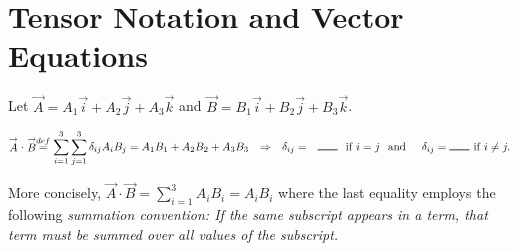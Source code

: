 
\chapter{Tensor Notation and Vector Equations} %

\label{Chapter1} %


\newcommand{\keyword}[1]{\textbf{#1}}
\newcommand{\tabhead}[1]{\textbf{#1}}
\newcommand{\code}[1]{\texttt{#1}}
\newcommand{\file}[1]{\texttt{\bfseries#1}}
\newcommand{\option}[1]{\texttt{\itshape#1}}

\vspace{.2in}

Let $\stackrel{\rightarrow}{A}=A_1\stackrel{\rightarrow}{i }+A_2\stackrel{\rightarrow}{j }+A_3\stackrel{\rightarrow}{k }$ and
$\stackrel{\rightarrow}{B}=B_1\stackrel{\rightarrow}{i }+B_2\stackrel{\rightarrow}{j }+B_3\stackrel{\rightarrow}{k }$.

\begin{displaymath}
\stackrel{\rightarrow}{A} \cdot \stackrel{\rightarrow}{B} \stackrel{def}{=} \sum_{i=1}^3 \sum_{j=1}^3 \delta_{ij}A_iB_j =A_1B_1+A_2B_2+A_3B_3\hspace{.1in} \Rightarrow \hspace{.1in}  \delta_{ij} = \hspace{.1in}\rule{.25in}{.01in}\hspace{.1in} \textup{if}\hspace{.05in} i=j \hspace{.1in}\textup{and} \hspace{.2in} \delta_{ij}=\rule{.25in}{.01in} \hspace{.05in}\textup{if}\hspace{.05in} i\neq j.
\end{displaymath}

{\flushleft More} concisely, $\stackrel{\rightarrow}{A} \cdot \stackrel{\rightarrow}{B} = \sum_{i=1}^3 A_iB_i = A_iB_i$ where the last equality employs the following \emph{summation convention: If the same subscript appears in a term, that term must be summed over all values of the subscript.}

